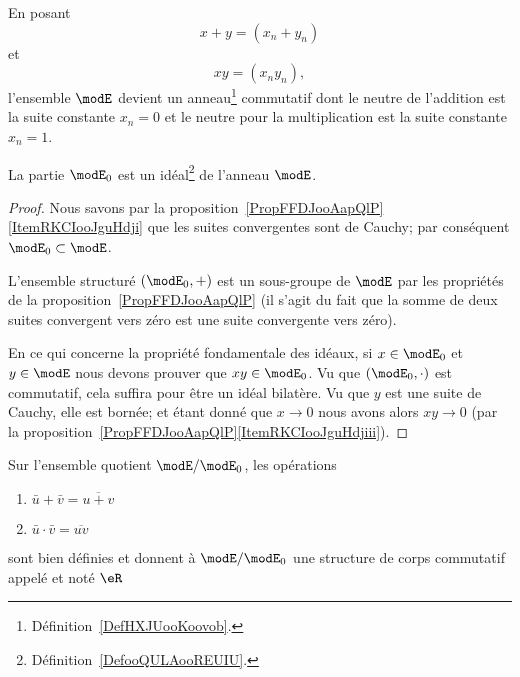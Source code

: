En posant
\begin{equation}
    x+y=(x_n+y_n)
\end{equation}
et
\begin{equation}
    xy=(x_ny_n),
\end{equation}
l'ensemble \( \modE\) devient un anneau\footnote{Définition~\ref{DefHXJUooKoovob}.} commutatif dont le neutre de l'addition est la suite constante \( x_n=0\) et le neutre pour la multiplication est la suite constante \( x_n=1\).

\begin{proposition}     \label{PROPooNUQVooAAkicK}
    La partie \( \modE_0\) est un idéal\footnote{Définition~\ref{DefooQULAooREUIU}.} de l'anneau \( \modE\).
\end{proposition}

\begin{proof}
    Nous savons par la proposition~\ref{PropFFDJooAapQlP}\ref{ItemRKCIooJguHdji} que les suites convergentes sont de Cauchy; par conséquent \( \modE_0\subset\modE\).

    L'ensemble structuré \( (\modE_0,+)\) est un sous-groupe de \( \modE\) par les propriétés de la proposition~\ref{PropFFDJooAapQlP} (il s'agit du fait que la somme de deux suites convergent vers zéro est une suite convergente vers zéro).

    En ce qui concerne la propriété fondamentale des idéaux, si \( x\in\modE_0\) et \( y\in\modE\) nous devons prouver que \( xy\in \modE_0\). Vu que \( (\modE_0,\cdot)\) est commutatif, cela suffira pour être un idéal bilatère. Vu que \( y\) est une suite de Cauchy, elle est bornée; et étant donné que \( x\to 0\) nous avons alors \( xy\to 0\) (par la proposition~\ref{PropFFDJooAapQlP}\ref{ItemRKCIooJguHdjiii}).
\end{proof}

\begin{theoremDef}       \label{DefooFKYKooOngSCB}
    Sur l'ensemble quotient \( \modE/\modE_0\), les opérations
    \begin{enumerate}
        \item
            \( \bar u+\bar v=\overline{ u+v }\)
        \item
            \( \bar u\cdot \bar v=\overline{ uv }\)
    \end{enumerate}
    sont bien définies et donnent à \( \modE/\modE_0\) une structure de corps commutatif appelé  et noté \( \eR\)
\end{theoremDef}

